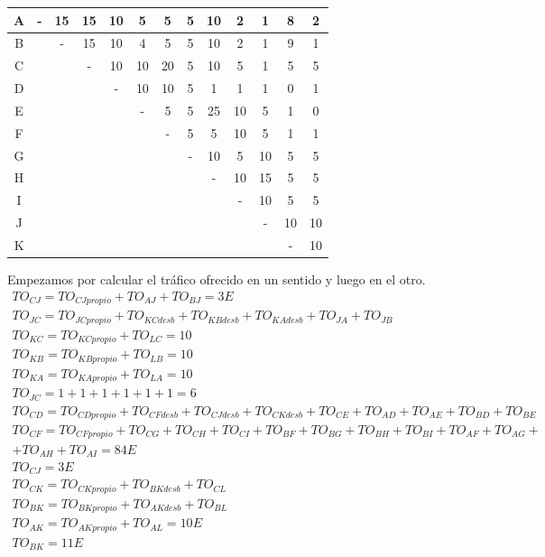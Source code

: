 \begin{exercise}[9]
\begin{center}
\begin{tabular}{| c | c | c | c | c | c | c | c | c | c | c | c | c |}
 A & - & 15 & 15 & 10 & 5  & 5  & 5 & 10 & 2  & 1  & 8  & 2 \\\hline
 B &   & -  & 15 & 10 & 4  & 5  & 5 & 10 & 2  & 1  & 9  & 1 \\\hline
 C &   &    & -  & 10 & 10 & 20 & 5 & 10 & 5  & 1  & 5  & 5 \\\hline
 D &   &    &    & -  & 10 & 10 & 5 & 1  & 1  & 1  & 0  & 1 \\\hline
 E &   &    &    &    & -  & 5  & 5 & 25 & 10 & 5  & 1  & 0 \\\hline
 F &   &    &    &    &    & -  & 5 & 5  & 10 & 5  & 1  & 1 \\\hline
 G &   &    &    &    &    &    & - & 10 & 5  & 10 & 5  & 5 \\\hline
 H &   &    &    &    &    &    &   & -  & 10 & 15 & 5  & 5 \\\hline
 I &   &    &    &    &    &    &   &    & -  & 10 & 5  & 5 \\\hline
 J &   &    &    &    &    &    &   &    &    & -  & 10 & 10 \\\hline
 K &   &    &    &    &    &    &   &    &    &    & -  & 10 \\\hline
\end{tabular}
\end{center}
Empezamos por calcular el tráfico ofrecido en un sentido y luego en el otro.
\begin{gather*}
TO_{CJ}=TO_{CJpropio}+TO_{AJ}+TO_{BJ}=3E\\
TO_{JC}=TO_{JCpropio}+TO_{KCdesb}+TO_{KBdesb}+TO_{KAdesb}+TO_{JA}+TO_{JB}\\
TO_{KC}=TO_{KCpropio}+TO_{LC}=10\\
TO_{KB}=TO_{KBpropio}+TO_{LB}=10\\
TO_{KA}=TO_{KApropio}+TO_{LA}=10\\
TO_{JC}=1+1+1+1+1+1=6\\
TO_{CD}=TO_{CDpropio}+TO_{CFdesb}+TO_{CJdesb}+TO_{CKdesb}+TO_{CE}+TO_{AD}+TO_{AE}+TO_{BD}+TO_{BE}\\
TO_{CF}=TO_{CFpropio}+TO_{CG}+TO_{CH}+TO_{CI}+TO_{BF}+TO_{BG}+TO_{BH}+TO_{BI}+TO_{AF}+TO_{AG}+\\
+TO_{AH}+TO_{AI}=84E\\
TO_{CJ}=3E\\
TO_{CK}=TO_{CKpropio}+TO_{BKdesb}+TO_{CL}\\
TO_{BK}=TO_{BKpropio}+TO_{AKdesb}+TO_{BL}\\
TO_{AK}=TO_{AKpropio}+TO_{AL}=10E\\
TO_{BK}=11E\\

\end{gather*}
\end{exercise}
